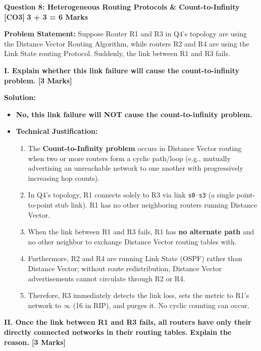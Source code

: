 \documentclass[11pt,a4paper]{article}
\newcommand{\questionheader}[3]{
    \vspace{0.35cm}
    \noindent\colorbox{qboxbg}{
        \parbox{\dimexpr\textwidth-2\fboxsep\relax}{
            \textbf{\textcolor{primary}{\large #1}} \hfill \textbf{\textcolor{accent}{[#2]}} \hfill \textbf{\textcolor{secondary}{#3 Marks}}
        }
    }
    \vspace{0.15cm}
}
\begin{document}
\questionheader{Question 8: Heterogeneous Routing Protocols \& Count-to-Infinity}{CO3}{3 + 3 = 6}

\textbf{Problem Statement:}
Suppose Router R1 and R3 in Q4's topology are using the Distance Vector Routing Algorithm, while routers R2 and R4 are using the Link State routing Protocol. Suddenly, the link between R1 and R3 fails.

\textbf{I. Explain whether this link failure will cause the count-to-infinity problem. [3 Marks]}

\textbf{Solution:}
\begin{itemize}
    \item \textbf{No, this link failure will NOT cause the count-to-infinity problem.}
    \item \textbf{Technical Justification:}
    \begin{enumerate}
        \item The \textbf{Count-to-Infinity problem} occurs in Distance Vector routing when two or more routers form a cyclic path/loop (e.g., mutually advertising an unreachable network to one another with progressively increasing hop counts).
        \item In Q4's topology, R1 connects solely to R3 via link \texttt{s0}--\texttt{s3} (a single point-to-point stub link). R1 has no other neighboring routers running Distance Vector.
        \item When the link between R1 and R3 fails, R1 has \textbf{no alternate path} and no other neighbor to exchange Distance Vector routing tables with.
        \item Furthermore, R2 and R4 are running Link State (OSPF) rather than Distance Vector; without route redistribution, Distance Vector advertisements cannot circulate through R2 or R4.
        \item Therefore, R3 immediately detects the link loss, sets the metric to R1's network to $\infty$ (16 in RIP), and purges it. No cyclic counting can occur.
    \end{enumerate}
\end{itemize}

\vspace{0.2cm}
\textbf{II. Once the link between R1 and R3 fails, all routers have only their directly connected networks in their routing tables. Explain the reason. [3 Marks]}
\end{document}
